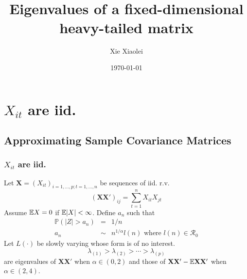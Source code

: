 \documentclass{beamer}
\title{Eigenvalues of a fixed-dimensional heavy-tailed matrix} %
\author{Xie Xiaolei} %
\institute[UCPH] %
{
Copenhagen University  \\ %
\medskip
\textit{xie.xiaolei@gmail.com} %
}
\date{\today} %
\renewcommand{\P}{
\mathbb P
}
\begin{document}
\begin{frame}
\titlepage %
\end{frame}


\section[iid data]{$X_{it}$ are iid.}
\subsection{Approximating Sample Covariance Matrices}
\begin{frame}
  \frametitle{$X_{it}$ are iid.}
  Let $\mathbf X = (X_{it})_{i=1,\dots,p; t = 1,\dots, n}$ be sequences of iid. r.v.
  \[
  (\mathbf{XX'})_{ij} = \sum_{t=1}^n X_{it}X_{jt}
  \]
  Assume $\mathbb{E} X = 0$ if $\mathbb{E} |X| < \infty$. Define $a_n$ such that
  \begin{eqnarray*}
    \P(|Z| > a_n) &=& 1/n  \\
    a_n &\sim& n^{1/\alpha} l(n) \text{ where } l(n) \in \mathcal R_{0}
  \end{eqnarray*}
  Let $L(\cdot)$ be slowly varying whose form is of no interest.
  \[
  \lambda_{(1)} > \lambda_{(2)} > \cdots > \lambda_{(p)}
  \]
  are eigenvalues of $\mathbf{XX'}$ when $\alpha \in (0, 2)$ and those of $\mathbf{XX'}
  - \mathbb{E} \mathbf{XX'}$ when $\alpha \in (2, 4)$.
\end{frame}

\end{document}
